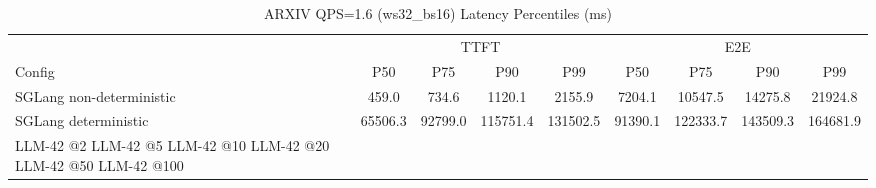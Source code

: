 \begin{table}[htbp]
\centering
\caption{ARXIV QPS=1.6 (ws32_bs16) Latency Percentiles (ms)}
\label{tab:arxiv_qps1.6_ws32_bs16}
\begin{tabular}{l|cccc|cccc}
\toprule
& \multicolumn{4}{c|}{TTFT} & \multicolumn{4}{c}{E2E} \\
Config & P50 & P75 & P90 & P99 & P50 & P75 & P90 & P99 \\
\midrule
SGLang non-deterministic & 459.0 & 734.6 & 1120.1 & 2155.9 & 7204.1 & 10547.5 & 14275.8 & 21924.8 \\
SGLang deterministic & 65506.3 & 92799.0 & 115751.4 & 131502.5 & 91390.1 & 122333.7 & 143509.3 & 164681.9 \\
LLM-42 @2%
LLM-42 @5%
LLM-42 @10%
LLM-42 @20%
LLM-42 @50%
LLM-42 @100%
\bottomrule
\end{tabular}
\end{table}
